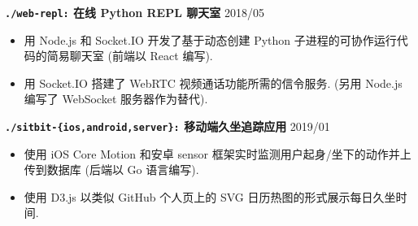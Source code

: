 \documentclass[10 pt]{article}
\begin{document}
\textbf{\texttt{./web-repl:} 在线 Python REPL 聊天室}  \hfill 2018/05 
\begin{itemize}
\item 用 Node.js 和 Socket.IO 开发了基于动态创建 Python 子进程的可协作运行代码的简易聊天室 (前端以 React 编写).
\item 用 Socket.IO 搭建了 WebRTC 视频通话功能所需的信令服务. (另用 Node.js 编写了 WebSocket 服务器作为替代).
\end{itemize}

\textbf{\texttt{./sitbit-\{ios,android,server\}:} 移动端久坐追踪应用} \hfill 2019/01
\begin{itemize}
\item 使用 iOS Core Motion 和安卓 sensor 框架实时监测用户起身/坐下的动作并上传到数据库 (后端以 Go 语言编写).
\item 使用 D3.js 以类似 GitHub 个人页上的 SVG 日历热图的形式展示每日久坐时间.
\end{itemize}
\end{document}
